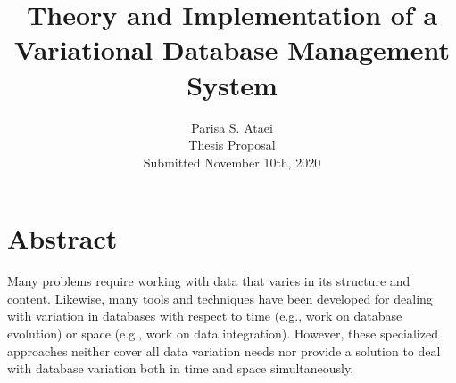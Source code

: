 \documentclass[11pt]{article}
\begin{document}
\title{Theory and Implementation of a Variational Database Management System}

\author{Parisa S. Ataei\\
Thesis Proposal \\
Submitted November 10th, 2020
}
\date{}

\maketitle

\section*{Abstract}
Many problems require working with data that varies in its structure and content. Likewise, many tools and techniques have been developed for dealing with variation in databases with respect to time (e.g., work on database evolution) or space (e.g., work on data integration).
However, these specialized approaches neither cover all data variation needs nor provide a solution to deal with database variation both in time and space simultaneously.
\end{document}
